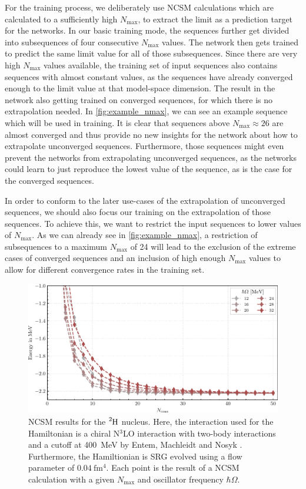 For the training process, we deliberately use NCSM calculations which are calculated to a sufficiently high $N_\mathrm{max}$, to extract the limit as a prediction target for the networks. In our basic training mode, the sequences further get divided into subsequences of four consecutive $N_\mathrm{max}$ values. The network then gets trained to predict the same limit value for all of those subsequences. Since there are very high $N_\mathrm{max}$ values available, the training set of input sequences also contains sequences with almost constant values, as the sequences have already converged enough to the limit value at that model-space dimension. The result in the network also getting trained on converged sequences, for which there is no extrapolation needed. In \autoref{fig:example_nmax}, we can see an example sequence which will be used in training. It is clear that sequences above $N_\mathrm{max} \approx 26$ are almost converged and thus provide no new insights for the network about how to extrapolate unconverged sequences. Furthermore, those sequences might even prevent the networks from extrapolating unconverged sequences, as the networks could learn to just reproduce the lowest value of the sequence, as is the case for the converged sequences.

In order to conform to the later use-cases of the extrapolation of unconverged sequences, we should also focus our training on the extrapolation of those sequences. To achieve this, we want to restrict the input sequences to lower values of $N_\mathrm{max}$. As we can already see in \autoref{fig:example_nmax}, a restriction of subsequences to a maximum $N_\mathrm{max}$ of 24 will lead to the exclusion of the extreme cases of converged sequences and an inclusion of high enough $N_\mathrm{max}$ values to allow for different convergence rates in the training set.
\begin{figure}[H]
  \centering
  \includegraphics{media/example_sequence.pdf}
  \caption{NCSM results for the $\n{2}{H}$ nucleus. Here, the interaction used for the Hamiltonian is a chiral N$^{3}$LO interaction with two-body interactions and a cutoff at \SI{400}{\mega\electronvolt} by Entem, Machleidt and Nosyk \cite{entemmachleidt}. Furthermore, the Hamiltionian is SRG evolved using a flow parameter of $\SI{0.04}{\femto\metre^4}$. Each point is the result of a NCSM calculation with a given $N_\mathrm{max}$ and oscillator frequency $\hbar \Omega$.}
  \label{fig:example_nmax}
\end{figure}
